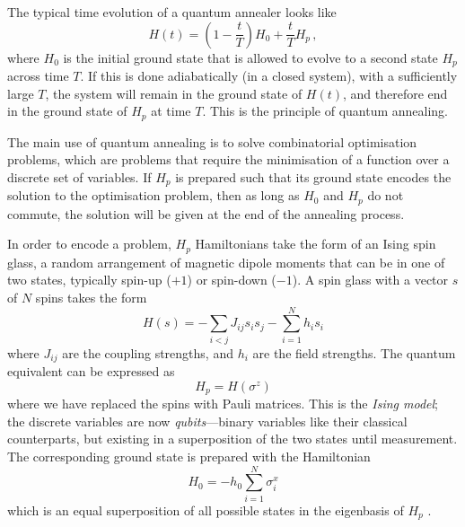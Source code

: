 \documentclass[aps,pra,12pt,onecolumn]{revtex4-2}
\begin{document}
The typical time evolution of a quantum annealer looks like
\begin{equation}
    H(t)=\left(1- \frac{t}{T}\right)H_0 + \frac{t}{T}H_p \,,
    \label{eq:time-evolution}
\end{equation}
where $H_0$ is the initial ground state that is allowed to evolve to a second state $H_p$ across time $T$. If this is done adiabatically (in a closed system), with a sufficiently large $T$, the system will remain in the ground state of $H(t)$, and therefore end in the ground state of $H_p$ at time $T$. This is the principle of quantum annealing.

The main use of quantum annealing is to solve combinatorial optimisation problems, which are problems that require the minimisation of a function over a discrete set of variables. If $H_p$ is prepared such that its ground state encodes the solution to the optimisation problem, then as long as $H_0$ and $H_p$ do not commute, the solution will be given at the end of the annealing process.

In order to encode a problem, $H_p$ Hamiltonians take the form of an Ising spin glass, a random arrangement of magnetic dipole moments that can be in one of two states, typically spin-up ($+1$) or spin-down ($-1$). A spin glass with a vector $s$ of $N$ spins takes the form
\begin{equation}
    H(s) = -\sum_{i<j}J_{ij}s_i s_j - \sum_{i=1}^{N}h_i s_i
    \label{eq:ising}
\end{equation}
where $J_{ij}$ are the coupling strengths, and $h_i$ are the field strengths. The quantum equivalent can be expressed as
\begin{equation}
    H_p = H(\sigma^z)
\end{equation}
where we have replaced the spins with Pauli matrices. This is the \textit{Ising model}; the discrete variables are now \textit{qubits}—binary variables like their classical counterparts, but existing in a superposition of the two states until measurement. The corresponding ground state is prepared with the Hamiltonian 
\begin{equation}
    H_0 = -h_0\sum_{i=1}^{N}\sigma_i^x
\end{equation}
which is an equal superposition of all possible states in the eigenbasis of $H_p$ \cite{lucas_ising_2014}.
\end{document}
